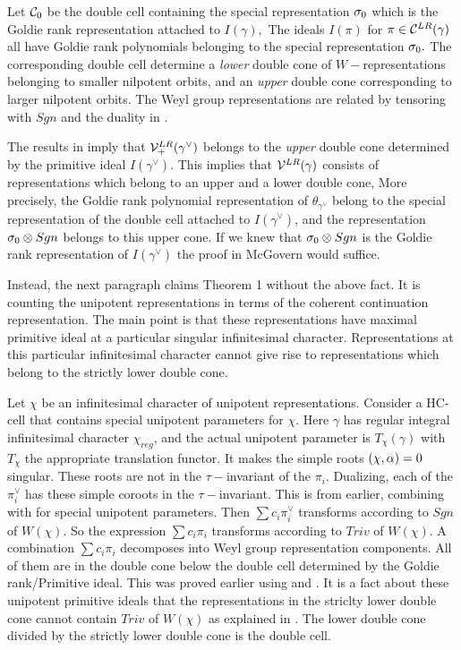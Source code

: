\documentclass[11pt ,reqno]{amsart}
\begin{document}
Let ${\mathcal C}_0$ be the double cell containing the special representation
${\sigma}_0$ which is the Goldie rank representation attached to $I(\gamma),$
The ideals $I(\pi)$ for $\pi\in
{\mathcal C}^{LR}(\gamma)$ all have Goldie rank polynomials belonging to the
special representation ${\sigma}_0.$ The corresponding double cell
determine a \textit{lower} double cone of $W-$representations belonging to smaller
nilpotent orbits, and an \textit{upper} double cone corresponding to
larger nilpotent orbits. The Weyl group representations  are related
by tensoring with $Sgn$ and the duality in \cite{BV2}. 

The results in \cite{V4}
imply that ${\mathcal V}_+^{LR}(\gamma^\vee)$ belongs to the \textit{upper} double cone
determined by the primitive ideal $I(\gamma^\vee).$
This implies that ${\mathcal V}^{LR}(\gamma)$ consists of representations which belong
to an upper and a lower double cone, More precisely, 
the Goldie rank polynomial representation of $\theta_{\gamma^\vee}$
belong to the special representation of the  double cell attached to
$I(\gamma^\vee)$, and the representation ${\sigma}_0\otimes Sgn$ belongs
to this upper cone. If we knew that ${\sigma}_0\otimes Sgn$ is the Goldie
rank representation of $I(\gamma^\vee)$ the proof in McGovern would
suffice. 


\medskip
Instead, the next paragraph claims Theorem 1 without the above fact. It is
counting the unipotent representations  in terms of the coherent
continuation representation. The main point is that these
representations have maximal primitive ideal at a particular singular
infinitesimal character. Representations at this particular
infinitesimal character cannot give rise to representations which
belong to the strictly lower double cone. 

\bigskip
Let $\chi$ be an infinitesimal character of unipotent
representations. Consider a HC-cell that contains  special unipotent
parameters for $\chi.$  Here $\gamma$ has regular
integral infinitesimal character $\chi_{reg}$, and the actual unipotent parameter
is $T_\chi(\gamma)$ with $T_\chi$ the appropriate translation functor.
It  makes the simple roots $(\chi,{\alpha})=0$ singular. These roots are not in the $\tau-$invariant of the
$\pi_i.$ Dualizing, each of the $\pi_i^\vee$ has these
simple coroots in the $\tau-$invariant. This is from earlier, combining \cite{V4} 
with \cite{ABV} for special unipotent parameters. Then
$\sum c_i\pi_i^\vee$ transforms according to $Sgn$ of $W(\chi).$ 
So the expression $\sum c_i\pi_i$ transforms according to $Triv$ of $W(\chi).$
A  combination $\sum c_i\pi_i$  decomposes into
Weyl group representation components. All of them are in the double
cone below the double cell determined by the Goldie rank/Primitive
ideal. This was proved earlier using \cite{V4} and \cite{C}.
It is a fact about these unipotent primitive ideals that the
representations in the striclty lower double cone cannot contain
$Triv$ of $W(\chi)$ as explained in \cite{BV2}. The lower double
cone divided by the strictly lower double cone is the double cell. 
\end{document}
